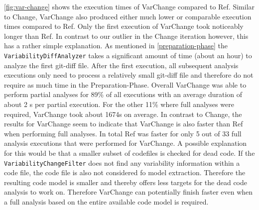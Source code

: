 \documentclass[a4paper]{article}
\begin{document}
\autoref{fig:var-change} shows the execution times of VarChange compared to Ref. Similar to Change, VarChange also produced either much lower or comparable execution times compared to Ref. Only the first execution of VarChange took noticeably longer than Ref. In contrast to our outlier in the Change iteration however, this has a rather simple explanation. As mentioned in \autoref{preparation-phase} the \texttt{Variability\-Diff\-Analyzer} takes a significant amount of time (about an hour) to analyze the first git-diff file. After the first execution, all subsequent analysis executions only need to process a relatively small git-diff file and therefore do not require as much time in the Preparation-Phase.  Overall VarChange was able to perform partial analyses for 89\% of all executions with an average duration of about 2 s per partial execution. For the other 11\% where full analyses were required, VarChange took about 1674s on average. In contrast to Change, the results for VarChange seem to indicate that VarChange is also faster than Ref when performing full analyses. In total Ref was faster for only 5 out of 33 full analysis executions that were performed for VarChange. A possible explanation for this would be that a smaller subset of codefiles is checked for dead code. If the \texttt{VariabilityChangeFilter} does not find any variability information within a code file, the code file is also not considered fo model extraction. Therefore the resulting code model is smaller and thereby offers less targets for the dead code analysis to work on. Therefore VarChange can potentially finish faster even when a full analysis based on the entire available code model is required.
\end{document}
